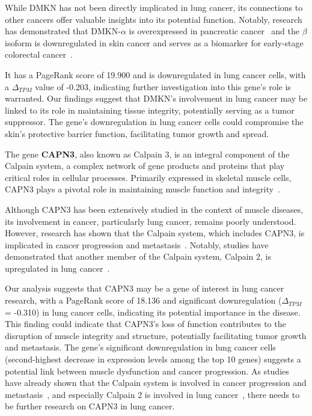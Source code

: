 While DMKN has not been directly implicated in lung cancer, its connections to other cancers offer valuable insights into its potential function.
Notably, research has demonstrated that DMKN-$\alpha$ is overexpressed in pancreatic cancer~\cite{Zhang2022DMKN}
and the $\beta$ isoform is downregulated in skin cancer and serves as a biomarker for early-stage colorectal cancer~\cite{Hasegawa2012Dermokine}.

It has a PageRank score of 19.900 and is downregulated in lung cancer cells,
with a $\Delta_{TPM}$ value of -0.203, indicating further investigation into this gene's role is warranted.
Our findings suggest that DMKN's involvement in lung cancer may be linked to its role in maintaining tissue integrity,
potentially serving as a tumor suppressor.
The gene's downregulation in lung cancer cells could compromise the skin's protective barrier function, facilitating tumor growth and spread.
\newline

The gene \textbf{CAPN3}, also known as Calpain 3, is an integral component of the Calpain system,
a complex network of gene products and proteins that play critical roles in cellular processes.
Primarily expressed in skeletal muscle cells, CAPN3 plays a pivotal role in maintaining muscle function and integrity~\cite{Spinozzi2021Calpain}.

Although CAPN3 has been extensively studied in the context of muscle diseases,
its involvement in cancer, particularly lung cancer, remains poorly understood.
However, research has shown that the Calpain system, which includes CAPN3, is implicated in cancer progression and metastasis~\cite{Storr2011Calpain}.
Notably, studies have demonstrated that another member of the Calpain system, Calpain 2, is upregulated in lung cancer~\cite{Xu2019Calpain}.

Our analysis suggests that CAPN3 may be a gene of interest in lung cancer research,
with a PageRank score of 18.136 and significant downregulation ($\Delta_{TPM}$ = -0.310) in lung cancer cells,
indicating its potential importance in the disease.
This finding could indicate that CAPN3's loss of function contributes to the disruption of muscle integrity and structure,
potentially facilitating tumor growth and metastasis.
The gene's significant downregulation in lung cancer cells (second-highest decrease in expression levels among the top 10 genes)
suggests a potential link between muscle dysfunction and cancer progression.
As studies have already shown that the Calpain system is involved in cancer progression and metastasis~\cite{Storr2011Calpain},
and especially Calpain 2 is involved in lung cancer~\cite{Xu2019Calpain}, there needs to be further research on CAPN3 in lung cancer.
\newline

